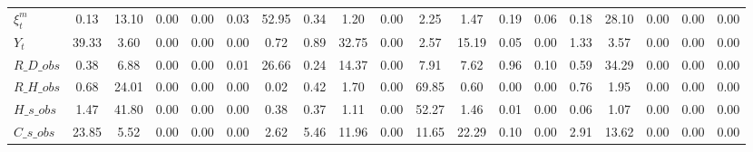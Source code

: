 \begin{center}
\begin{longtable}{lcccccccccccccccccc}
$  \xi^m_t          $	 & 	             0.13	 & 	            13.10	 & 	             0.00	 & 	             0.00	 & 	             0.03	 & 	            52.95	 & 	             0.34	 & 	             1.20	 & 	             0.00	 & 	             2.25	 & 	             1.47	 & 	             0.19	 & 	             0.06	 & 	             0.18	 & 	            28.10	 & 	             0.00	 & 	             0.00	 & 	             0.00 \\ 
$ Y_t               $	 & 	            39.33	 & 	             3.60	 & 	             0.00	 & 	             0.00	 & 	             0.00	 & 	             0.72	 & 	             0.89	 & 	            32.75	 & 	             0.00	 & 	             2.57	 & 	            15.19	 & 	             0.05	 & 	             0.00	 & 	             1.33	 & 	             3.57	 & 	             0.00	 & 	             0.00	 & 	             0.00 \\ 
$R\_D\_obs          $	 & 	             0.38	 & 	             6.88	 & 	             0.00	 & 	             0.00	 & 	             0.01	 & 	            26.66	 & 	             0.24	 & 	            14.37	 & 	             0.00	 & 	             7.91	 & 	             7.62	 & 	             0.96	 & 	             0.10	 & 	             0.59	 & 	            34.29	 & 	             0.00	 & 	             0.00	 & 	             0.00 \\ 
$R\_H\_obs          $	 & 	             0.68	 & 	            24.01	 & 	             0.00	 & 	             0.00	 & 	             0.00	 & 	             0.02	 & 	             0.42	 & 	             1.70	 & 	             0.00	 & 	            69.85	 & 	             0.60	 & 	             0.00	 & 	             0.00	 & 	             0.76	 & 	             1.95	 & 	             0.00	 & 	             0.00	 & 	             0.00 \\ 
$H\_s\_obs          $	 & 	             1.47	 & 	            41.80	 & 	             0.00	 & 	             0.00	 & 	             0.00	 & 	             0.38	 & 	             0.37	 & 	             1.11	 & 	             0.00	 & 	            52.27	 & 	             1.46	 & 	             0.01	 & 	             0.00	 & 	             0.06	 & 	             1.07	 & 	             0.00	 & 	             0.00	 & 	             0.00 \\ 
$C\_s\_obs          $	 & 	            23.85	 & 	             5.52	 & 	             0.00	 & 	             0.00	 & 	             0.00	 & 	             2.62	 & 	             5.46	 & 	            11.96	 & 	             0.00	 & 	            11.65	 & 	            22.29	 & 	             0.10	 & 	             0.00	 & 	             2.91	 & 	            13.62	 & 	             0.00	 & 	             0.00	 & 	             0.00 \\ 

\end{longtable}
\end{center}
